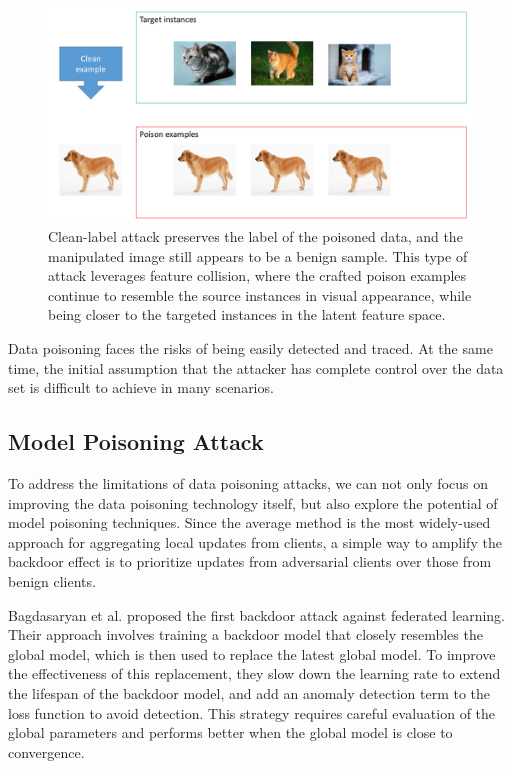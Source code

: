 \documentclass[conference]{IEEEtran}
\begin{document}
\begin{figure}[htbp]
    \centerline{\includegraphics[width=0.8\linewidth,height=0.6\linewidth]{picture/f7.png}}
    \caption{Clean-label attack preserves the label of the poisoned data,
    and the manipulated image still appears to be a benign sample. This type of attack
    leverages feature collision, where the crafted poison examples continue to
    resemble the source instances in visual appearance, while being closer to the
    targeted instances in the latent feature space.}
    \label{fig7}
\end{figure}

Data poisoning faces the risks of being easily detected and traced. 
At the same time, the initial assumption that the attacker has complete control over the data set is difficult to achieve in many scenarios.


\subsection{Model Poisoning Attack}
To address the limitations of data poisoning attacks, we can not only focus on
improving the data poisoning technology itself, but also explore the potential
of model poisoning techniques. Since the average method is the most widely-used
approach for aggregating local updates from clients, a simple way to amplify
the backdoor effect is to prioritize updates from adversarial clients over
those from benign clients.

Bagdasaryan et al.\cite{b241} proposed the first backdoor attack against federated learning.
Their approach involves training a backdoor model that closely resembles the global
model, which is then used to replace the latest global model.
To improve the effectiveness of this replacement, they slow down
the learning rate to extend the lifespan of the backdoor model, and add an
anomaly detection term to the loss function to avoid detection. This
strategy requires careful evaluation of the global parameters and performs
better when the global model is close to convergence.
\end{document}
